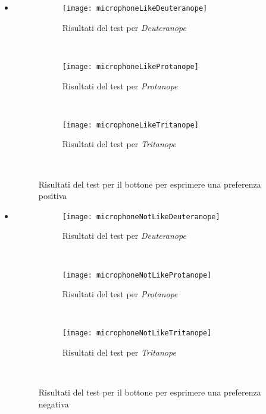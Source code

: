 \begin{itemize}

    \item[]

        \begin{figure}[H]
            \centering
            \begin{subfigure}[b]{0.3\textwidth}
                \texttt{[image: microphoneLikeDeuteranope]}
                \caption{Risultati del test per \textit{Deuteranope}}
            \end{subfigure}
        ~
            \begin{subfigure}[b]{0.3\textwidth}
                \texttt{[image: microphoneLikeProtanope]}
                \caption{Risultati del test per \textit{Protanope}}
            \end{subfigure}
        ~
            \begin{subfigure}[b]{0.3\textwidth}
                \texttt{[image: microphoneLikeTritanope]}
                \caption{Risultati del test per \textit{Tritanope}}
            \end{subfigure}
        ~
            \caption{Risultati del test per il bottone per esprimere una preferenza positiva}
        \end{figure}

    \item[]

        \begin{figure}[H]
            \centering
            \begin{subfigure}[b]{0.3\textwidth}
                \texttt{[image: microphoneNotLikeDeuteranope]}
                \caption{Risultati del test per \textit{Deuteranope}}
            \end{subfigure}
        ~
            \begin{subfigure}[b]{0.3\textwidth}
                \texttt{[image: microphoneNotLikeProtanope]}
                \caption{Risultati del test per \textit{Protanope}}
            \end{subfigure}
        ~
            \begin{subfigure}[b]{0.3\textwidth}
                \texttt{[image: microphoneNotLikeTritanope]}
                \caption{Risultati del test per \textit{Tritanope}}
            \end{subfigure}
        ~
            \caption{Risultati del test per il bottone per esprimere una preferenza negativa}
        \end{figure}

\end{itemize}

